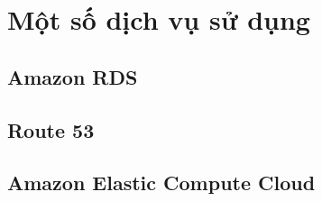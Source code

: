 \section{Một số dịch vụ sử dụng}
\label{method}

\subsection{Amazon RDS}

\subsection{Route 53}

\subsection{Amazon Elastic Compute Cloud}

